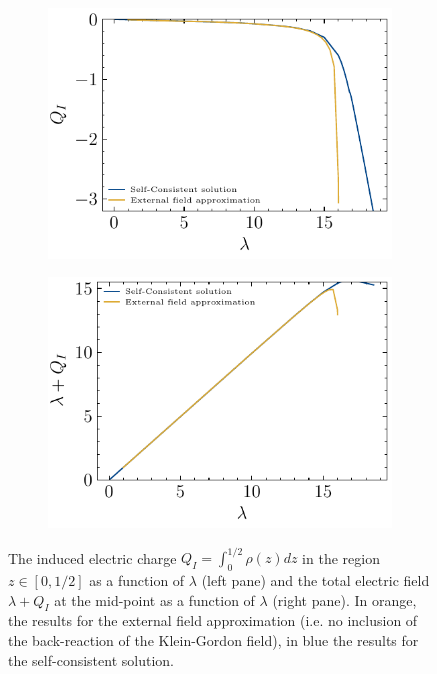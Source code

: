 \begin{figure}
\begin{subfigure}{0.5\textwidth}
    \centering
    \includegraphics[width=0.95\linewidth]{figures/dirichlet/inducedCharge.pdf}
\end{subfigure}
\begin{subfigure}{0.5\textwidth}
    \centering
    \includegraphics[width=0.95\linewidth]{figures/dirichlet/electricFieldInduced.pdf}
\end{subfigure}
 \caption{The induced electric charge $Q_I = \int_0^{1/2}\rho(z)dz$ in the region $z\in[0,1/2]$ as a function of $\lambda$ (left pane) and the total electric field $\lambda + Q_I$ at the mid-point as a function of $\lambda$ (right pane). In orange, the results for the external field approximation (i.e. no inclusion of the back-reaction of the Klein-Gordon field), in blue the results for the self-consistent solution. }
\label{fig:induced-charge}
\end{figure}


